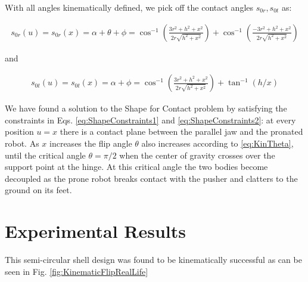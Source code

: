 \documentclass[letterpaper]{report}
\begin{document}
With all angles kinematically defined, we pick off the contact angles $s_{0r}, s_{0t}$ as:

\begin{align}
  s_{0r}(u) = s_{0r}(x) = \alpha + \theta + \phi = \cos^{-1} \left( \frac{3r^2 + h^2 + x^2}{2r \sqrt{h^2 + x^2}} \right) + \cos^{-1} \left( \frac{-3r^2 + h^2 + x^2}{2r \sqrt{h^2 + x^2}} \right)
\end{align}

and

\begin{align}
  s_{0t}(u) = s_{0t}(x) = \alpha + \phi = \cos^{-1} \left( \frac{3r^2 + h^2 + x^2}{2r \sqrt{h^2 + x^2}} \right) + \tan^{-1}(h/x)
\end{align}

We have found a solution to the Shape for Contact problem by satisfying the constraints in Eqs. \ref{eq:ShapeConstraints1} and \ref{eq:ShapeConstraints2}: at every position $u = x$ there is a contact plane between the parallel jaw and the pronated robot.
As $x$ increases the flip angle $\theta$ also increases according to \ref{eq:KinTheta}, until the critical angle $\theta = \pi/2$ when the center of gravity crosses over the support point at the hinge.
At this critical angle the two bodies become decoupled as the prone robot breaks contact with the pusher and clatters to the ground on its feet.

\section{Experimental Results}

This semi-circular shell design was found to be kinematically successful as can be seen in Fig. \ref{fig:KinematicFlipRealLife}
\end{document}

